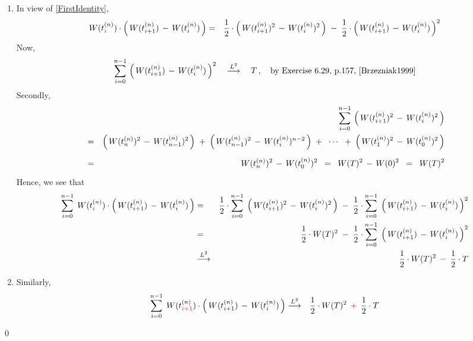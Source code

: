 \begin{enumerate}
\item
	In view of \eqref{FirstIdentity},
	\begin{eqnarray*}
	W(t^{(n)}_{{\color{red}i}})\cdot\left(\,W(t^{(n)}_{i+1}) \,-\, W(t^{(n)}_{i})\,\right)
	& = &
		\dfrac{1}{2} \cdot \left(\,W(t^{(n)}_{i+1})^{2} \,-\, W(t^{(n)}_{i})^{2}\,\right)
		\; - \;
		\dfrac{1}{2} \cdot \left(\,W(t^{(n)}_{i+1}) \,-\, W(t^{(n)}_{i})\,\right)^{2}
	\end{eqnarray*}
	Now,
	\begin{equation*}
	\overset{n-1}{\underset{i=0}{\sum}}\,
	\left(\,W(t^{(n)}_{i+1}) \,-\, W(t^{(n)}_{i})\,\right)^{2}
	\quad
	\overset{L^{2}}{\longrightarrow}
	\quad
	T\,,
	\quad
	\textnormal{by Exercise 6.29, p.157, \cite{Brzezniak1999}}
	\end{equation*}
	Secondly,
	\begin{eqnarray*}
	&&
		\overset{n-1}{\underset{i=0}{\sum}}\,
		\left(\,W(t^{(n)}_{i+1})^{2} \,-\, W(t^{(n)}_{i})^{2}\,\right)
	\\
	& = &
		\left(\,W(t^{(n)}_{n})^{2} \,-\, W(t^{(n)}_{n-1})^{2}\,\right)
		\; + \;
		\left(\,W(t^{(n)}_{n-1})^{2} \,-\, W(t^{(n)}_{i})^{n-2}\,\right)
		\; + \;
		\;\cdots\;
		\; + \;
		\left(\,W(t^{(n)}_{1})^{2} \,-\, W(t^{(n)}_{0})^{2}\,\right)
	\\
	& \overset{{\color{white}\textnormal{\Large$1$}}}{=} &
		W(t^{(n)}_{n})^{2} \,-\, W(t^{(n)}_{0})^{2}
	\;\; = \;\;
		W(T)^{2} \,-\, W(0)^{2}
	\;\; = \;\;
		W(T)^{2}
	\end{eqnarray*}
	Hence, we see that
	\begin{eqnarray*}
	\overset{n-1}{\underset{i=0}{\sum}}\;\,
	W(t^{(n)}_{{\color{red}i}})\cdot\left(\,W(t^{(n)}_{i+1}) \,-\, W(t^{(n)}_{i})\,\right)
	& = &
		\dfrac{1}{2}
		\cdot
		\overset{n-1}{\underset{i=0}{\sum}}\;
		\left(\,W(t^{(n)}_{i+1})^{2} \,-\, W(t^{(n)}_{i})^{2}\,\right)
		\; - \;
		\dfrac{1}{2}
		\cdot
		\overset{n-1}{\underset{i=0}{\sum}}\;
		\left(\,W(t^{(n)}_{i+1}) \,-\, W(t^{(n)}_{i})\,\right)^{2}
	\\
	& = &
		\dfrac{1}{2} \cdot W(T)^{2}
		\; - \;
		\dfrac{1}{2}
		\cdot
		\overset{n-1}{\underset{i=0}{\sum}}\;
		\left(\,W(t^{(n)}_{i+1}) \,-\, W(t^{(n)}_{i})\,\right)^{2}
	\\
	& \overset{L^{2}}{\longrightarrow} &
		\dfrac{1}{2} \cdot W(T)^{2}
		\;\,{\color{red}-}\;\,
		\dfrac{1}{2} \cdot T
	\end{eqnarray*}
\item
	Similarly,
	\begin{eqnarray*}
	\overset{n-1}{\underset{i=0}{\sum}}\;\,
	W(t^{(n)}_{{\color{red}i+1}})\cdot\left(\,W(t^{(n)}_{i+1}) \,-\, W(t^{(n)}_{i})\,\right)
	& \overset{L^{2}}{\longrightarrow} &
		\dfrac{1}{2} \cdot W(T)^{2}
		\;\,{\color{red}+}\;\,
		\dfrac{1}{2} \cdot T
	\end{eqnarray*}
\end{enumerate}
\qed


\renewcommand{\theenumi}{\roman{enumi}}
\renewcommand{\labelenumi}{\textnormal{(\theenumi)}$\;\;$}

